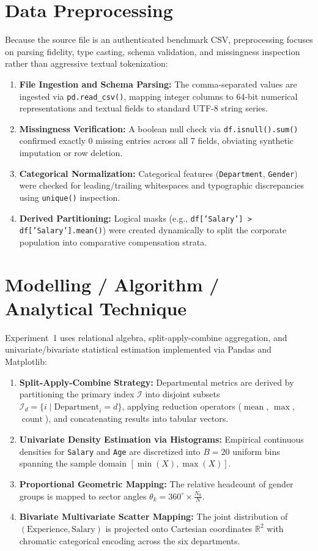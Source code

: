 \section{Data Preprocessing}
Because the source file is an authenticated benchmark CSV, preprocessing focuses on parsing fidelity, type casting, schema validation, and missingness inspection rather than aggressive textual tokenization:
\begin{enumerate}
    \item \textbf{File Ingestion and Schema Parsing:} The comma-separated values are ingested via \texttt{pd.read\_csv()}, mapping integer columns to 64-bit numerical representations and textual fields to standard UTF-8 string series.
    \item \textbf{Missingness Verification:} A boolean null check via \texttt{df.isnull().sum()} confirmed exactly 0 missing entries across all 7 fields, obviating synthetic imputation or row deletion.
    \item \textbf{Categorical Normalization:} Categorical features (\texttt{Department}, \texttt{Gender}) were checked for leading/trailing whitespaces and typographic discrepancies using \texttt{unique()} inspection.
    \item \textbf{Derived Partitioning:} Logical masks (e.g., \texttt{df['Salary'] > df['Salary'].mean()}) were created dynamically to split the corporate population into comparative compensation strata.
\end{enumerate}

\section{Modelling / Algorithm / Analytical Technique}
Experiment~1 uses relational algebra, split-apply-combine aggregation, and univariate/bivariate statistical estimation implemented via Pandas and Matplotlib:
\begin{enumerate}
    \item \textbf{Split-Apply-Combine Strategy:} Departmental metrics are derived by partitioning the primary index $\mathcal{I}$ into disjoint subsets $\mathcal{I}_d = \{i \mid \text{Department}_i = d\}$, applying reduction operators ($\operatorname{mean}$, $\operatorname{max}$, $\operatorname{count}$), and concatenating results into tabular vectors.
    \item \textbf{Univariate Density Estimation via Histograms:} Empirical continuous densities for \texttt{Salary} and \texttt{Age} are discretized into $B = 20$ uniform bins spanning the sample domain $[\min(X), \max(X)]$.
    \item \textbf{Proportional Geometric Mapping:} The relative headcount of gender groups is mapped to sector angles $\theta_k = 360^\circ \times \frac{N_k}{N}$.
    \item \textbf{Bivariate Multivariate Scatter Mapping:} The joint distribution of $(\text{Experience}, \text{Salary})$ is projected onto Cartesian coordinates $\mathbb{R}^2$ with chromatic categorical encoding across the six departments.
\end{enumerate}

